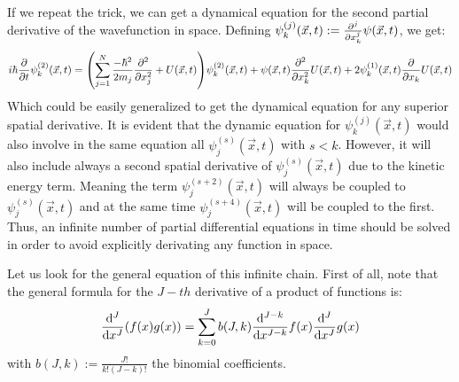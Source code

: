 \documentclass[11pt, a4paper]{article} %
\begin{document}
If we repeat the trick, we can get a dynamical equation for the second partial derivative of the wavefunction in space.
Defining $\psi^{(j)}_k(\vec{x},t):=\pdv[j]{}{x_k}\psi(\vec{x},t)$, we get:
\begin{equation}
i\hbar \pdv{}{t}\psi^{(2)}_k(\vec{x},t) = \qty(\sum_{j=1}^N\frac{-\hbar^2}{2m_j}\pdv[2]{}{x_j}+U(\vec{x},t))\psi^{(2)}_k(\vec{x},t)+ \psi(\vec{x},t)\pdv[2]{}{x_k}U(\vec{x},t)+2\psi^{(1)}_k(\vec{x},t)\pdv{}{x_k}U(\vec{x},t)
\end{equation}
Which could be easily generalized to get the dynamical equation for any superior spatial derivative. It is evident that the dynamic equation for $\psi^{(j)}_k(\vec{x},t)$ would also involve in the same equation all $\psi^{(s)}_j(\vec{x},t)$ with $s<k$. However, it will also include always a second spatial derivative of $\psi^{(s)}_j(\vec{x},t)$ due to the kinetic energy term. Meaning the term $\psi^{(s+2)}_j(\vec{x},t)$ will always be coupled to $\psi^{(s)}_j(\vec{x},t)$ and at the same time $\psi^{(s+4)}_j(\vec{x},t)$ will be coupled to the first. Thus, an infinite number of partial differential equations in time should be solved in order to avoid explicitly derivating any function in space. 

Let us look for the general equation of this infinite chain. First of all, note that the general formula for the $J-th$ derivative of a product of functions is:
\begin{equation}
\dv[J]{}{x}\qty(f(x)g(x))=\sum_{k=0}^J b(J, k)\dv[J-k]{}{x}f(x)\dv[J]{}{x}g(x)
\end{equation}
with $b(J,k):=\frac{J!}{k!(J-k)!}$ the binomial coefficients.
\end{document}
